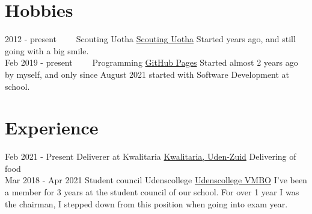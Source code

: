 \documentclass[letterpaper]{twentysecondcv} %
\begin{document}
\section{Hobbies}

\begin{twenty} %
	\twentyitem
    	{2012 -}
        {present~~~~}
        {Scouting Uotha}
        {\href{https://www.uotha.nl/}{Scouting Uotha}}
        {}
        { Started years ago, and still going with a big smile.}\\
	\twentyitem
    	{Feb 2019 -}
        {present~~~~}
        {Programming}
        {\href{https://tais993.github.io/}{GitHub Pages}}
        {}
        {Started almost 2 years ago by myself, and only since August 2021 started with Software Development at school.}
\end{twenty}

\vspace{6mm}



\section{Experience}
\begin{twenty} %
	\twentyitem
    		{Feb 2021 -}
		{Present}
        		{Deliverer at Kwalitaria}
        		{\href{https://kwalitaria.nl/uden-zuid/uden-zuid/}{Kwalitaria, Uden-Zuid}}
        		{}
        		{Delivering of food}\\
		\twentyitem
    		{Mar 2018 -}
		{Apr 2021}
        		{Student council Udenscollege}
        		{\href{https://www.udenscollege.nl/vmbo/startpagina-vmbo/}{Udenscollege VMBO}}
        		{}
        		{
        		    I've been a member for 3 years at the student council of our school.
        		    For over 1 year I was the chairman, I stepped down from this position when going into exam year.
        		}
\end{twenty}

\vspace{6mm}
\end{document}
